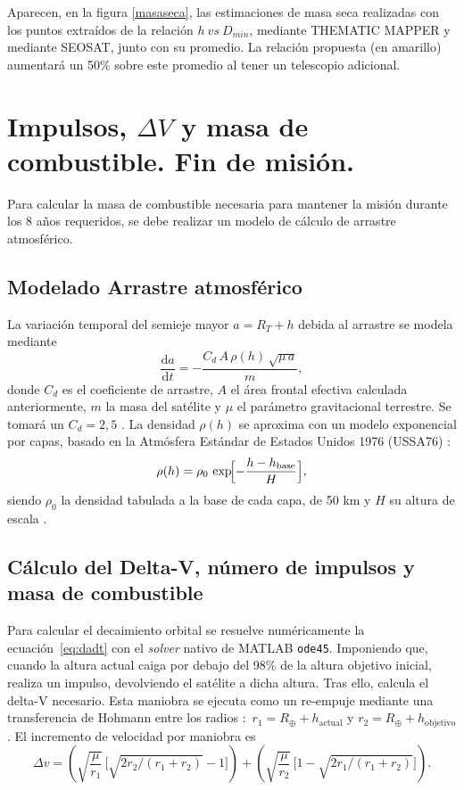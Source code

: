 Aparecen, en la figura \ref{masaseca}, las estimaciones  de masa seca realizadas con los puntos extraídos de la relación $h\ vs\ D_{min}$, mediante THEMATIC MAPPER y mediante SEOSAT, junto con su promedio. La relación propuesta (en amarillo) aumentará un 50\% sobre este promedio al tener un telescopio adicional.

\section{Impulsos, $\Delta V$ y masa de combustible. Fin de misión. }

Para calcular la masa de combustible necesaria para mantener la misión durante los 8 años requeridos, se debe realizar un modelo de cálculo de arrastre atmosférico.

\subsection{Modelado Arrastre atmosférico}

La variación temporal del semieje mayor \(a= R_T+h\) debida al arrastre se modela mediante
\begin{equation}
\frac{\mathrm d a}{\mathrm d t}=-
\frac{C_{d}\,A\,\rho(h)\,\sqrt{\mu\,a}}{m},
\label{eq:dadt}
\end{equation}
donde \(C_{d}\) es el coeficiente de arrastre, \(A\) el área frontal efectiva calculada anteriormente, 
\(m\) la masa del satélite y \(\mu\) el parámetro gravitacional terrestre. Se tomará un $C_d = 2,5$ \cite{cook1965satellite}.
La densidad \(\rho(h)\) se aproxima con un modelo exponencial por capas, basado en la Atmósfera Estándar de Estados Unidos 1976 (USSA76) \cite{usstandardatmosphere1976}:  
\begin{equation}
\rho(h)=\rho_{0}\,
\exp\!\Bigl[-\dfrac{h-h_{\text{base}}}{H}\Bigr],
\end{equation}
siendo \(\rho_{0}\) la densidad tabulada a la base de cada capa, de 50 km y \(H\) su altura
de escala \cite{vallado2013fundamentals}.  


\subsection{Cálculo del Delta-V, número de impulsos y masa de
combustible}\label{sec:deltav}

Para calcular el decaimiento orbital se resuelve numéricamente la ecuación~\eqref{eq:dadt}  con el \textit{solver} nativo de MATLAB \texttt{ode45}. Imponiendo que, cuando la altura actual caiga por debajo del 98\% de la altura objetivo inicial, realiza un impulso, devolviendo el satélite a dicha altura. Tras ello, calcula el delta-V necesario. Esta maniobra se ejecuta como un re‐empuje mediante una transferencia de Hohmann entre los radios \cite{curtis2020orbital}:
\(\,r_{1}=R_{\oplus}+h_{\text{actual}}\) y
\(r_{2}=R_{\oplus}+h_{\text{objetivo}}\).  
El incremento de velocidad por maniobra es
\begin{equation}
\Delta v =
\left(\sqrt{\frac{\mu}{r_{1}}}\,
      \bigl[\sqrt{2r_{2}/(r_{1}+r_{2})}-1\bigr]\right)
+
\left(\sqrt{\frac{\mu}{r_{2}}}\,
      \bigl[1-\sqrt{2r_{1}/(r_{1}+r_{2})}\bigr]\right).
\label{eq:dv_hohmann}
\end{equation}

